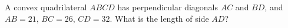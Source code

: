 A convex quadrilateral $ABCD$ has perpendicular diagonals $AC$ and $BD$, and $AB=21$, $BC=26$, $CD=32$. What is the length of side $AD$?
